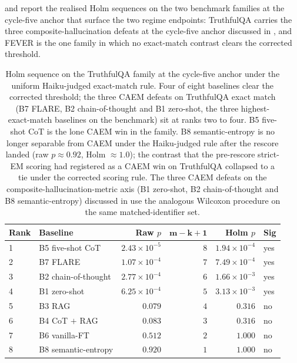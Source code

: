  and  report the realised Holm sequences on the two benchmark families at the cycle-five anchor that surface the two regime endpoints: TruthfulQA carries the three composite-hallucination defeats at the cycle-five anchor discussed in , and FEVER is the one family in which no exact-match contrast clears the corrected threshold.

\begin{table}[H]
\centering\footnotesize
\setlength{\tabcolsep}{6pt}
\renewcommand{\arraystretch}{1.1}
\begin{tabular}{@{}llrrrl@{}}
\toprule
\textbf{Rank} & \textbf{Baseline} & \textbf{Raw $p$} & $\boldsymbol{m-k+1}$ & \textbf{Holm $p$} & \textbf{Sig} \\
\midrule
1 & B5 five-shot CoT    & $2.43 \times 10^{-5}$ & $8$ & $1.94 \times 10^{-4}$ & yes \\
2 & B7 FLARE            & $1.07 \times 10^{-4}$ & $7$ & $7.49 \times 10^{-4}$ & yes \\
3 & B2 chain-of-thought & $2.77 \times 10^{-4}$ & $6$ & $1.66 \times 10^{-3}$ & yes \\
4 & B1 zero-shot        & $6.25 \times 10^{-4}$ & $5$ & $3.13 \times 10^{-3}$ & yes \\
5 & B3 RAG              & $0.079$ & $4$ & $0.316$ & no \\
6 & B4 CoT $+$ RAG      & $0.083$ & $3$ & $0.316$ & no \\
7 & B6 vanilla-FT       & $0.512$ & $2$ & $1.000$ & no \\
8 & B8 semantic-entropy & $0.920$ & $1$ & $1.000$ & no \\
\bottomrule
\end{tabular}
\caption[Holm sequence on the TruthfulQA family at the cycle-five anchor]{Holm sequence on the TruthfulQA family at the cycle-five anchor under the uniform Haiku-judged exact-match rule. Four of eight baselines clear the corrected threshold; the three CAEM defeats on TruthfulQA exact match (B7 FLARE, B2 chain-of-thought and B1 zero-shot, the three highest-exact-match baselines on the benchmark) sit at ranks two to four. B5 five-shot CoT is the lone CAEM win in the family. B8 semantic-entropy is no longer separable from CAEM under the Haiku-judged rule after the rescore landed (raw $p \approx 0.92$, Holm $\approx 1.0$); the contrast that the pre-rescore strict-EM scoring had registered as a CAEM win on TruthfulQA collapsed to a tie under the corrected scoring rule. The three CAEM defeats on the composite-hallucination-metric axis (B1 zero-shot, B2 chain-of-thought and B8 semantic-entropy) discussed in  use the analogous Wilcoxon procedure on the same matched-identifier set.}
\label{tab:app-sig-holm-tqa}
\end{table}

